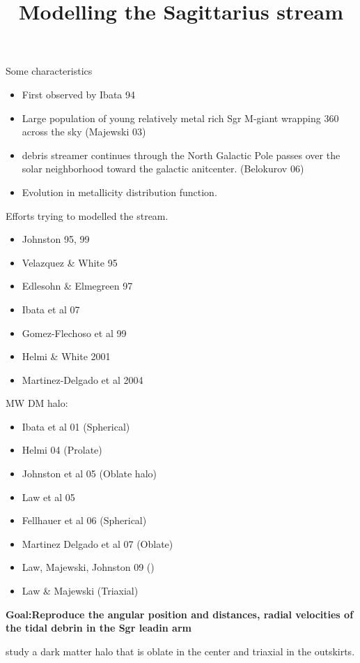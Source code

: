 \documentclass[12pt]{article}
\title{\begin{LARGE}
{Modelling the Sagittarius stream}
\end{LARGE}}
\begin{document}
\maketitle

Some characteristics

\begin{itemize}
\item First observed by Ibata 94
\item Large population of young relatively metal rich Sgr M-giant wrapping 360
across the sky  (Majewski 03)
\item debris streamer continues through the North Galactic Pole passes over the 
solar neighborhood toward the galactic anitcenter. (Belokurov 06)
\item Evolution in metallicity distribution function.
\end{itemize}

Efforts trying to modelled the stream.

\begin{itemize}
\item Johnston 95, 99
\item Velazquez \& White 95
\item Edlesohn \& Elmegreen 97
\item Ibata et al 07
\item Gomez-Flechoso et al 99
\item Helmi \& White 2001
\item Martinez-Delgado et al 2004
\end{itemize}

MW DM halo:

\begin{itemize}
\item Ibata et al 01 (Spherical)
\item Helmi 04 (Prolate)
\item Johnston et al 05 (Oblate halo)
\item Law et al 05
\item Fellhauer et al 06 (Spherical)
\item Martinez Delgado et al 07 (Oblate)
\item Law, Majewski, Johnston 09 ()
\item Law \& Majewski (Triaxial)
\end{itemize}

\textbf{Goal:Reproduce the angular position and distances, radial velocities of 
the tidal debrin in the Sgr leadin arm } 


\citep{Vera13} study a dark matter halo that is oblate in the center
 and triaxial in the outskirts. 
\end{document}
